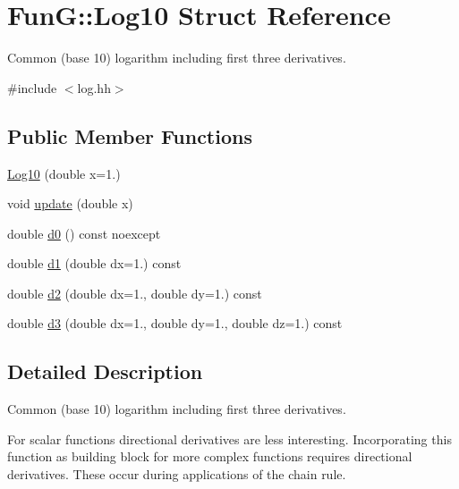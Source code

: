 \hypertarget{structFunG_1_1Log10}{\section{\-Fun\-G\-:\-:\-Log10 \-Struct \-Reference}
\label{structFunG_1_1Log10}
}


\-Common (base 10) logarithm including first three derivatives.  




{\ttfamily \#include $<$log.\-hh$>$}

\subsection*{\-Public \-Member \-Functions}
\begin{DoxyCompactItemize}
\item 
\hyperlink{structFunG_1_1Log10_acfc491f166bfb75b593864849f33fbb0}{\-Log10} (double x=1.)
\item 
void \hyperlink{structFunG_1_1Log10_a232acaf336d555a2d4b9eefb5dee4272}{update} (double x)
\item 
double \hyperlink{structFunG_1_1Log10_a0046c146e0a7111ec65acf8ee13c7d85}{d0} () const noexcept
\item 
double \hyperlink{structFunG_1_1Log10_aa58c6a61851745d626ada5485331f51c}{d1} (double dx=1.) const 
\item 
double \hyperlink{structFunG_1_1Log10_a54c3c5131cf317a2188a07a5f56e87c1}{d2} (double dx=1., double dy=1.) const 
\item 
double \hyperlink{structFunG_1_1Log10_a385b674f76566344a0188bf8f213b5ec}{d3} (double dx=1., double dy=1., double dz=1.) const 
\end{DoxyCompactItemize}


\subsection{\-Detailed \-Description}
\-Common (base 10) logarithm including first three derivatives. 

\-For scalar functions directional derivatives are less interesting. \-Incorporating this function as building block for more complex functions requires directional derivatives. \-These occur during applications of the chain rule. 

